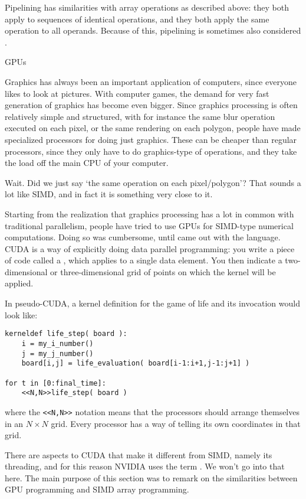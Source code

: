 Pipelining has similarities with array operations as described above:
they both apply to sequences of identical operations, and they both
apply the same operation to all operands. Because of this, pipelining
is sometimes also considered .

 {GPUs}
\label{sec:gpu}

Graphics has always been an important application of computers, since
everyone likes to look at pictures. With computer games, the demand
for very fast generation of graphics has become even bigger. 
Since graphics processing is often relatively simple and structured, with 
for instance the same
blur operation executed on each pixel, or the same rendering on each polygon,
people have made specialized processors for doing just graphics. These can be
cheaper than regular processors, since they only have to do graphics-type
of operations, and they take the load off the main CPU of your computer.

Wait. Did we just say `the same operation on each pixel/polygon'? That sounds
a lot like \ac{SIMD}, and in fact it is something very close to it.

Starting from the realization that graphics processing has a lot
in common with traditional parallelism, people have tried to use \acp{GPU}
for \ac{SIMD}-type numerical computations. Doing so was cumbersome,
until  came out with the  language.
\ac{CUDA} is a way of explicitly doing data parallel programming:
you write a piece of code called a , which 
applies to a single data element. You then indicate a two-dimensional
or three-dimensional grid of points on which the kernel will be applied.

In pseudo-CUDA, a kernel definition for the game of life and its invocation
would look like:
\begin{verbatim}
kerneldef life_step( board ):
    i = my_i_number()
    j = my_j_number()
    board[i,j] = life_evaluation( board[i-1:i+1,j-1:j+1] )

for t in [0:final_time]:
    <<N,N>>life_step( board )
\end{verbatim}
where the \verb+<<N,N>>+ notation means that the processors should arrange
themselves in an $N\times N$ grid. Every processor has a way of telling
its own coordinates in that grid.

There are aspects to CUDA that make it different from SIMD, namely 
its threading, and for this reason NVIDIA uses the term
.  We won't go into that here. The main purpose of this
section was to remark on the similarities between GPU programming
and \ac{SIMD} array programming.


